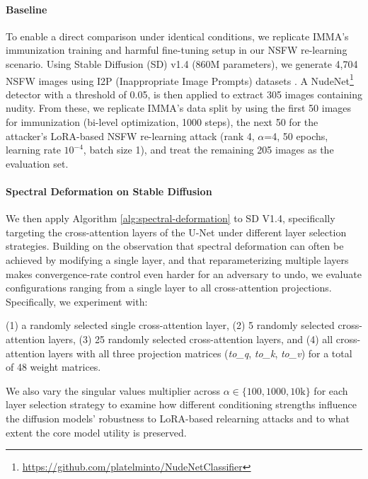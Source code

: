 \documentclass{article}
\theoremstyle{plain}
\theoremstyle{definition}
\theoremstyle{remark}
\begin{document}
\paragraph{Baseline} To enable a direct comparison under identical conditions, we replicate IMMA’s immunization training and harmful fine-tuning setup in our NSFW re-learning scenario. Using Stable Diffusion (SD) v1.4 (860M parameters), we generate 4,704 NSFW images using I2P (Inappropriate Image Prompts) datasets \citep{schramowski2022safe}. A NudeNet\footnote{\url{https://github.com/platelminto/NudeNetClassifier}} detector with a threshold of 0.05, is then applied to extract 305 images containing nudity. From these, we replicate IMMA's data split by using the first 50 images for immunization (bi-level optimization, 1000 steps), the next 50 for the attacker's LoRA-based NSFW re-learning attack (rank 4, $\alpha$=4, 50 epochs, learning rate $10^{-4}$, batch size 1), and treat the remaining 205 images as the evaluation set.

\paragraph{Spectral Deformation on Stable Diffusion} We then apply Algorithm \ref{alg:spectral-deformation} to SD V1.4, specifically targeting the cross-attention layers of the U-Net under different layer selection strategies. Building on the observation that spectral deformation can often be achieved by modifying a single layer, and that reparameterizing multiple layers makes convergence-rate control even harder for an adversary to undo, we evaluate configurations ranging from a single layer to all cross-attention projections. Specifically, we experiment with: 

(1) a randomly selected single cross-attention layer, (2) 5 randomly selected cross-attention layers, (3) 25 randomly selected cross-attention layers, and (4) all cross-attention layers with all three projection matrices (\textit{to\_q}, \textit{to\_k}, \textit{to\_v}) for a total of 48 weight matrices. 

We also vary the singular values multiplier across $\alpha \in \{100, 1000, 10\mathrm{k}\}$ for each layer selection strategy to examine how different conditioning strengths influence the diffusion models' robustness to LoRA-based relearning attacks and to what extent the core model utility is preserved.
\end{document}
